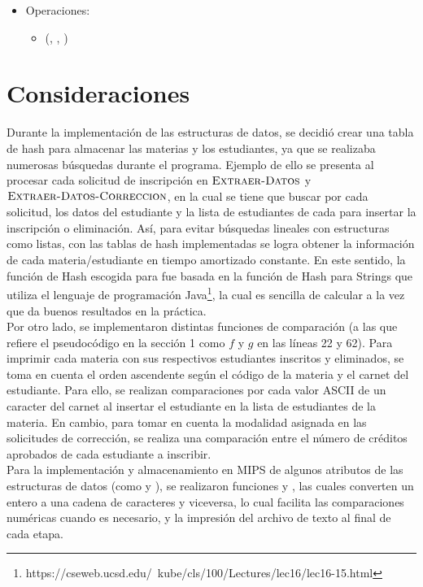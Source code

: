 \documentclass[11pt]{article}
\begin{document}
\begin{itemize}
      \begin{itemize}
         \item Operaciones:
         
         \begin{itemize}
            \item {}(, , )
         \end{itemize}
      \end{itemize}
      
   \end{itemize}

\section{Consideraciones}
Durante la implementación de las estructuras de datos, se decidió crear una tabla de hash para
almacenar las materias y los estudiantes, ya que se realizaba numerosas búsquedas durante el programa. 
Ejemplo de ello se presenta al procesar cada solicitud de inscripción en $\textnormal{\scshape Extraer-Datos}$
y $\textnormal{\scshape Extraer-Datos-Correccion}$, en la cual se tiene que buscar por cada solicitud, los datos
del estudiante y la lista de estudiantes de cada  para insertar la inscripción o eliminación. 
Así, para evitar búsquedas lineales con estructuras como listas, con las tablas de hash implementadas se logra 
obtener la información de cada materia/estudiante en tiempo amortizado constante. En este sentido, la función 
de Hash escogida para  fue basada en la función de Hash para Strings que utiliza el lenguaje 
de programación Java\footnote{https://cseweb.ucsd.edu/~kube/cls/100/Lectures/lec16/lec16-15.html}, la
cual es sencilla de calcular a la vez que da buenos resultados en la práctica. \\

Por otro lado, se implementaron distintas funciones de comparación (a las que refiere el pseudocódigo en
la sección 1 como $f$ y $g$ en las líneas 22 y 62). Para imprimir cada materia con sus
respectivos estudiantes inscritos y eliminados, se toma en cuenta el orden ascendente según el código
de la materia y el carnet del estudiante. Para ello, se realizan comparaciones por cada valor ASCII de 
un caracter del carnet al insertar el estudiante en la lista de estudiantes de la materia. 
En cambio, para tomar en cuenta la modalidad asignada en las solicitudes de corrección, se realiza una 
comparación entre el número de créditos aprobados de cada estudiante a inscribir. \\

Para la implementación y almacenamiento en MIPS de algunos atributos de las estructuras de datos
(como  y ), se realizaron funciones  y , las cuales
converten un entero a una cadena de caracteres y viceversa, lo cual facilita las comparaciones
numéricas cuando es necesario, y la impresión del archivo de texto al final de cada etapa. \\
\end{document}
